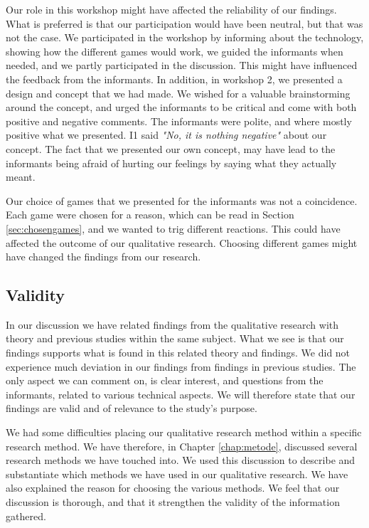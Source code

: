 Our role in this workshop might have affected the reliability of our findings. What is preferred is that our participation would have been neutral, but that was not the case. We participated in the workshop by informing about the technology, showing how the different games would work, we guided the informants when needed, and we partly participated in the discussion. This might have influenced the feedback from the informants. In addition, in workshop 2, we presented a design and concept that we had made. We wished for a valuable brainstorming around the concept, and urged the informants to be critical and come with both positive and negative comments. The informants were polite, and where mostly positive what we presented. I1 said \emph{"No, it is nothing negative"} about our concept. The fact that we presented our own concept, may have lead to the informants being afraid of hurting our feelings by saying what they actually meant.

Our choice of games that we presented for the informants was not a coincidence. Each game were chosen for a reason, which can be read in Section \ref{sec:chosengames}, and we wanted to trig different reactions. This could have affected the outcome of our qualitative research. Choosing different games might have changed the findings from our research.  

\subsection{Validity}

In our discussion we have related findings from the qualitative research with theory and previous studies within the same subject. What we see is that our findings supports what is found in this related theory and findings. We did not experience much deviation in our findings from findings in previous studies. The only aspect we can comment on, is clear interest, and questions from the informants, related to various technical aspects. We will therefore state that our findings are valid and of relevance to the study's purpose. 

We had some difficulties placing our qualitative research method within a specific research method. We have therefore, in Chapter \ref{chap:metode}, discussed several research methods we have touched into. We used this discussion to describe and substantiate which methods we have used in our qualitative research. We have also explained the reason for choosing the various methods. We feel that our discussion is thorough, and that it strengthen the validity of the information gathered. 

